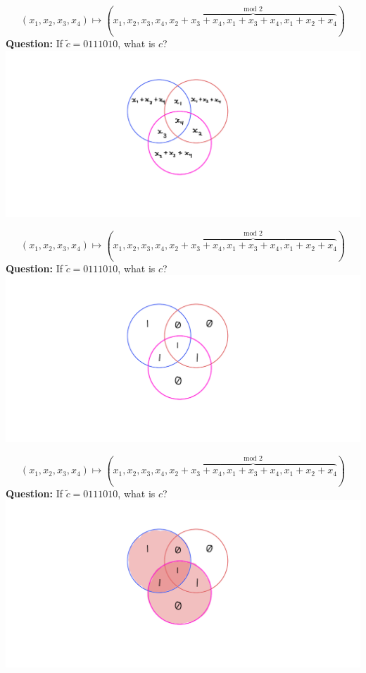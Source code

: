 \documentclass[aspectratio=169]{beamer}
\begin{document}
\begin{frame}{}
\[
(x_1, x_2, x_3, x_4) \mapsto (x_1, x_2, x_3, x_4, \overbrace{x_2 + x_3 + x_4, x_1 + x_3 + x_4, x_1 + x_2 + x_4}^{\text{mod }2})
\]
\textcolor{sigma@alertred}{\textbf{Question:}} If $\tilde{c} = 0111010$, what is $c$?
    \includegraphics[width=\textwidth]{images/coding-02.png}
\end{frame}
\begin{frame}{}
\[
(x_1, x_2, x_3, x_4) \mapsto (x_1, x_2, x_3, x_4, \overbrace{x_2 + x_3 + x_4, x_1 + x_3 + x_4, x_1 + x_2 + x_4}^{\text{mod }2})
\]
\textcolor{sigma@alertred}{\textbf{Question:}} If $\tilde{c} = 0111010$, what is $c$?
    \includegraphics[width=\textwidth]{images/coding-03.png}
\end{frame}
\begin{frame}{}
\[
(x_1, x_2, x_3, x_4) \mapsto (x_1, x_2, x_3, x_4, \overbrace{x_2 + x_3 + x_4, x_1 + x_3 + x_4, x_1 + x_2 + x_4}^{\text{mod }2})
\]
\textcolor{sigma@alertred}{\textbf{Question:}} If $\tilde{c} = 0111010$, what is $c$?
    \includegraphics[width=\textwidth]{images/coding-04.png}
\end{frame}
\end{document}
